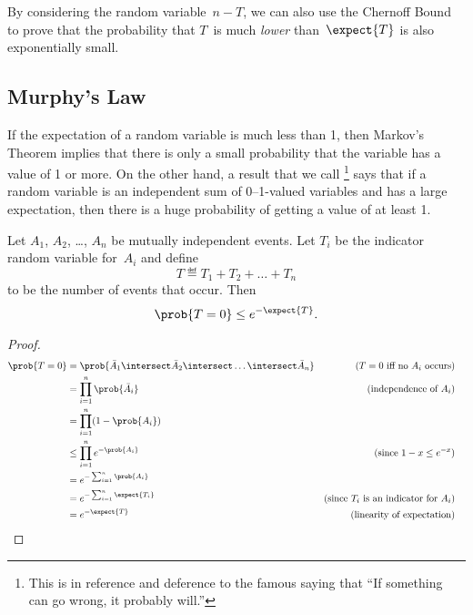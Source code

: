 By considering the random variable~$n - T$, we can also use the
Chernoff Bound to prove that the probability that $T$~is much
\emph{lower} than~$\expect{T}$ is also exponentially small.

\subsection{Murphy's Law}

If the expectation of a random variable is much less than 1, then
Markov's Theorem implies that there is only a small probability that
the variable has a value of 1 or more.  On the other hand, a result
that we call \footnote{This is in reference and
  deference to the famous saying that ``If something can go wrong, it probably
  will.''} says that if a random variable is an independent
sum of 0--1-valued variables and has a large expectation, then there is
a huge probability of getting a value of at least 1.


\begin{theorem}\label{th:murphy}
Let $A_1$, $A_2$, \dots, $A_n$ be mutually independent events.  Let
$T_i$ be the indicator random variable for~$A_i$ and define
\begin{equation*}
    T \eqdef T_1 + T_2 + \dots + T_n
\end{equation*}
to be the number of events that occur.  Then
\begin{equation*}
    \prob{T = 0} \le e^{- \expect{T}}.
\end{equation*}
\end{theorem}

\begin{proof}
\begin{align*}
\prob{T = 0}
    &= \prob{ \bar{A}_1 \intersect \bar{A}_2 \intersect \dots
  \intersect \bar{A}_n } 
        & \text{($T=0$ iff no $A_i$ occurs)}\\
    &= \prod_{i = 1}^n \prob{\bar{A}_i}
        & \text{(independence of $A_i$)} \\
    &= \prod_{i = 1}^n (1 - \prob{A_i}) \\
    &\le \prod_{i = 1}^n e^{-\prob{A_i}}
        & \text{(since $1 - x \le e^{-x}$)} \\
    &= e^{-\sum_{i = 1}^n \prob{A_i}} \\
    &= e^{-\sum_{i = 1}^n \expect{T_i}} 
        & \text{(since $T_i$ is an indicator for $A_i$)} \\
    &= e^{-\expect{T}}
        & \text{(linearity of expectation)}
        & \qedhere
\end{align*}
\end{proof}

